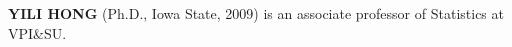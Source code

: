 \documentclass{scspaperproc}
\theoremstyle{scsthe}
\begin{document}
\textbf{\uppercase{Yili Hong}} (Ph.D., Iowa State, 2009) is an
associate professor of Statistics at VPI\&SU.





\end{document}

